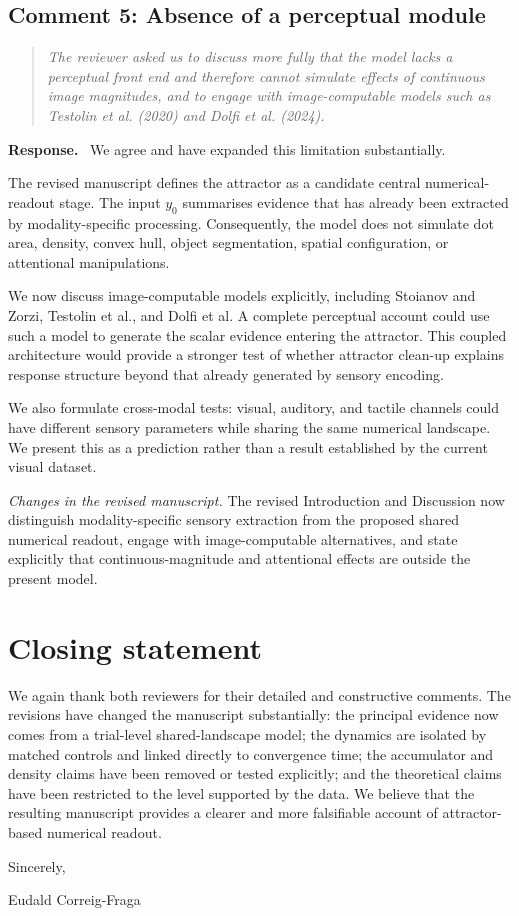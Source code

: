 \documentclass[11pt]{article}
\newenvironment{reviewercomment}{\begin{quote}\color{reviewgray}\itshape}{\end{quote}}
\newenvironment{authorresponse}{\par\noindent\textbf{\color{responseblue}Response.}\ }{\par}
\newcommand{\change}[1]{\par\noindent\textit{Changes in the revised manuscript.} #1\par}
\begin{document}
\subsection*{Comment 5: Absence of a perceptual module}

\begin{reviewercomment}
The reviewer asked us to discuss more fully that the model lacks a perceptual front end and therefore cannot simulate effects of continuous image magnitudes, and to engage with image-computable models such as Testolin et al. (2020) and Dolfi et al. (2024).
\end{reviewercomment}

\begin{authorresponse}
We agree and have expanded this limitation substantially.

The revised manuscript defines the attractor as a candidate central numerical-readout stage. The input $y_0$ summarises evidence that has already been extracted by modality-specific processing. Consequently, the model does not simulate dot area, density, convex hull, object segmentation, spatial configuration, or attentional manipulations.

We now discuss image-computable models explicitly, including Stoianov and Zorzi, Testolin et al., and Dolfi et al. A complete perceptual account could use such a model to generate the scalar evidence entering the attractor. This coupled architecture would provide a stronger test of whether attractor clean-up explains response structure beyond that already generated by sensory encoding.

We also formulate cross-modal tests: visual, auditory, and tactile channels could have different sensory parameters while sharing the same numerical landscape. We present this as a prediction rather than a result established by the current visual dataset.
\end{authorresponse}

\change{The revised Introduction and Discussion now distinguish modality-specific sensory extraction from the proposed shared numerical readout, engage with image-computable alternatives, and state explicitly that continuous-magnitude and attentional effects are outside the present model.}

\section*{Closing statement}

We again thank both reviewers for their detailed and constructive comments. The revisions have changed the manuscript substantially: the principal evidence now comes from a trial-level shared-landscape model; the dynamics are isolated by matched controls and linked directly to convergence time; the accumulator and density claims have been removed or tested explicitly; and the theoretical claims have been restricted to the level supported by the data. We believe that the resulting manuscript provides a clearer and more falsifiable account of attractor-based numerical readout.

Sincerely,

Eudald Correig-Fraga
\end{document}

